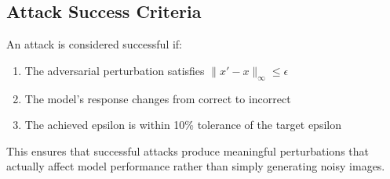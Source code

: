 \subsection{Attack Success Criteria}

An attack is considered successful if:
\begin{enumerate}
    \item The adversarial perturbation satisfies $\|x' - x\|_\infty \leq \epsilon$
    \item The model's response changes from correct to incorrect
    \item The achieved epsilon is within 10\% tolerance of the target epsilon
\end{enumerate}

This ensures that successful attacks produce meaningful perturbations that actually affect model performance rather than simply generating noisy images.